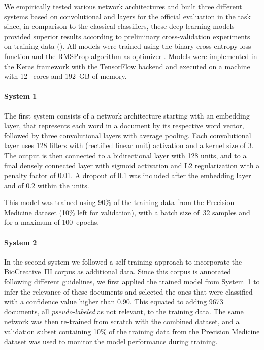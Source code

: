 We empirically tested various network architectures and built three different systems based on convolutional and  layers for the official evaluation in the task since, in comparison to the classical classifiers, these deep learning models provided superior results according to preliminary cross-validation experiments on training data ().
All models were trained using the binary cross-entropy loss function and the RMSProp algorithm as optimizer \parencite{hinton2012a}.
Models were implemented in the Keras framework \parencite{chollet2015a} with the TensorFlow backend \parencite{abadi2016a} and executed on a machine with 12~ cores and 192~GB of memory.


\paragraph{System 1}

The first system consists of a network architecture starting with an embedding layer, that represents each word in a document by its respective word vector, followed by three convolutional layers with average pooling.
Each convolutional layer uses 128 filters with  (rectified linear unit) activation and a kernel size of 3.
The output is then connected to a bidirectional  layer with 128 units, and to a final densely connected layer with sigmoid activation and L2 regularization with a penalty factor of 0.01.
A dropout of 0.1 was included after the embedding layer and of 0.2 within the  units.

This model was trained using 90\% of the training data from the Precision Medicine dataset (10\% left for validation), with a batch size of~32 samples and for a maximum of 100~epochs.


\paragraph{System 2}

In the second system we followed a self-training approach to incorporate the BioCreative~III  corpus as additional data.
Since this corpus is annotated following different guidelines, we first applied the trained model from System~1 to infer the relevance of these documents and selected the ones that were classified with a confidence value higher than 0.90.
This equated to adding 9673 documents, all \textit{pseudo-labeled} as not relevant, to the training data.
The same network was then re-trained from scratch with the combined dataset, and a validation subset containing 10\% of the training data from the Precision Medicine dataset was used to monitor the model performance during training.


